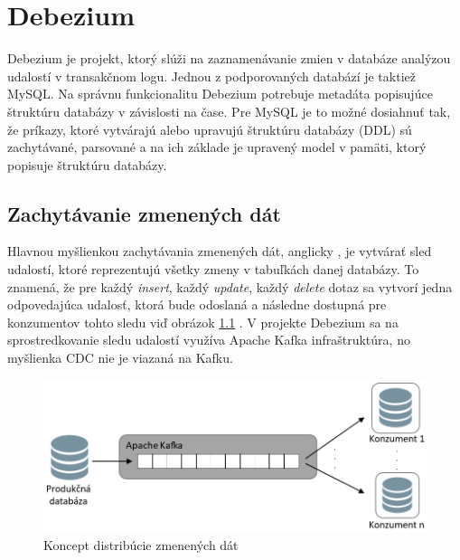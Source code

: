 \chapter{Debezium}
Debezium\cite{Debezium} je projekt, ktorý slúži na zaznamenávanie zmien v databáze analýzou udalostí v transakčnom logu. Jednou z podporovaných databází je taktiež MySQL. Na správnu funkcionalitu Debezium potrebuje metadáta popisujúce štruktúru databázy v závislosti na čase. Pre MySQL je to možné dosiahnuť tak, že príkazy, ktoré vytvárajú alebo upravujú štruktúru databázy (DDL) sú zachytávané, parsované a na ich základe je upravený model v pamäti, ktorý popisuje štruktúru databázy.

\section{Zachytávanie zmenených dát}
Hlavnou myšlienkou zachytávania zmenených dát, anglicky , je vytvárať sled udalostí, ktoré reprezentujú všetky zmeny v tabuľkách danej databázy. To znamená, že pre každý \textit{insert}, každý \textit{update}, každý \textit{delete} dotaz sa vytvorí jedna odpovedajúca udalosť, ktorá bude odoslaná a následne dostupná pre konzumentov tohto sledu viď obrázok \ref{fig:CDC} \cite{debezium:devoxx}. V projekte Debezium sa na sprostredkovanie sledu udalostí využíva Apache Kafka \cite{Kafka} infraštruktúra, no myšlienka CDC nie je viazaná na Kafku.

\begin{figure}[H]
\begin{center}
\includegraphics[width=15cm]{figures/CDC_1.PNG}
\caption{Koncept distribúcie zmenených dát}
\label{fig:CDC}
\end{center}
\end{figure}

